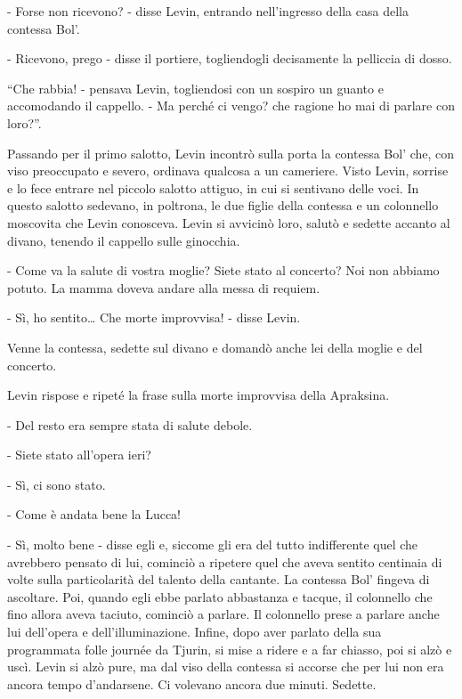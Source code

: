 \label{vi-6} 

- Forse non ricevono? - disse Levin, entrando nell'ingresso della casa della contessa Bol'. 

- Ricevono, prego - disse il portiere, togliendogli decisamente la pelliccia di dosso. 

``Che rabbia! - pensava Levin, togliendosi con un sospiro un guanto e accomodando il cappello. - Ma perché ci vengo? che ragione ho mai di parlare con loro?''. 

Passando per il primo salotto, Levin incontrò sulla porta la contessa Bol' che, con viso preoccupato e severo, ordinava qualcosa a un cameriere. Visto Levin, sorrise e lo fece entrare nel piccolo salotto attiguo, in cui si sentivano delle voci. In questo salotto sedevano, in poltrona, le due figlie della contessa e un colonnello moscovita che Levin conosceva. Levin si avvicinò loro, salutò e sedette accanto al divano, tenendo il cappello sulle ginocchia. 

- Come va la salute di vostra moglie? Siete stato al concerto? Noi non abbiamo potuto. La mamma doveva andare alla messa di requiem. 

- Sì, ho sentito\ldots{} Che morte improvvisa! - disse Levin. 

Venne la contessa, sedette sul divano e domandò anche lei della moglie e del concerto. 

Levin rispose e ripeté la frase sulla morte improvvisa della Apraksina. 

- Del resto era sempre stata di salute debole. 

- Siete stato all'opera ieri? 

- Sì, ci sono stato. 

- Come è andata bene la Lucca! 

- Sì, molto bene - disse egli e, siccome gli era del tutto indifferente quel che avrebbero pensato di lui, cominciò a ripetere quel che aveva sentito centinaia di volte sulla particolarità del talento della cantante. La contessa Bol' fingeva di ascoltare. Poi, quando egli ebbe parlato abbastanza e tacque, il colonnello che fino allora aveva taciuto, cominciò a parlare. Il colonnello prese a parlare anche lui dell'opera e dell'illuminazione. Infine, dopo aver parlato della sua programmata folle journée da Tjurin, si mise a ridere e a far chiasso, poi si alzò e uscì. Levin si alzò pure, ma dal viso della contessa si accorse che per lui non era ancora tempo d'andarsene. Ci volevano ancora due minuti. Sedette. 

